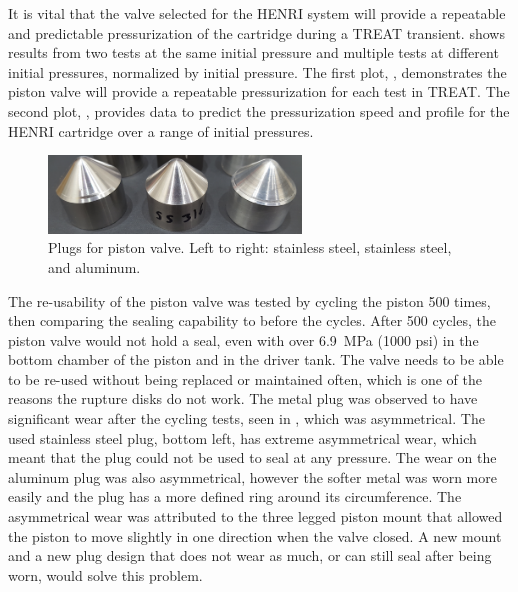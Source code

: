 It is vital that the valve selected for the HENRI system will provide a repeatable and predictable pressurization of the cartridge during a TREAT transient.  shows results from two tests at the same initial pressure and multiple tests at different initial pressures, normalized by initial pressure. The first plot, , demonstrates the piston valve will provide a repeatable pressurization for each test in TREAT. The second plot, , provides data to predict the pressurization speed and profile for the HENRI cartridge over a range of initial pressures.



\begin{figure}[tb]
    \vspace{16pt}
    \centering
    \includegraphics[width=0.6\textwidth]{design/photos/plug_gen1_wear_crop.png}
    \caption{Plugs for piston valve. Left to right: stainless steel, stainless steel, and aluminum.}
    \label{fig:plug wear}
    \vspace{16pt}
\end{figure}

The re-usability of the piston valve was tested by cycling the piston 500 times, then comparing the sealing capability to before the cycles. After 500 cycles, the piston valve would not hold a seal, even with over \SI{6.9}{\mega\pascal} (1000 psi) in the bottom chamber of the piston and in the driver tank. The valve needs to be able to be re-used without being replaced or maintained often, which is one of the reasons the rupture disks do not work. The metal plug was observed to have significant wear after the cycling tests, seen in , which was asymmetrical. The used stainless steel plug, bottom left, has extreme asymmetrical wear, which meant that the plug could not be used to seal at any pressure. The wear on the aluminum plug was also asymmetrical, however the softer metal was worn more easily and the plug has a more defined ring around its circumference. The asymmetrical wear was attributed to the three legged piston mount that allowed the piston to move slightly in one direction when the valve closed. A new mount and a new plug design that does not wear as much, or can still seal after being worn, would solve this problem.



